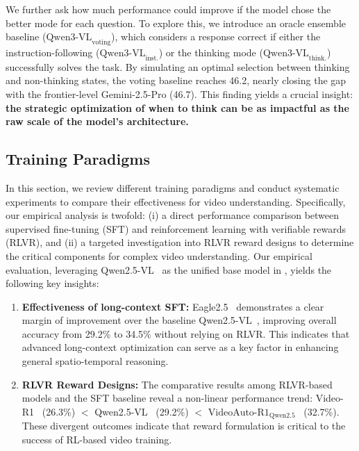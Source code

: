 \documentclass[runningheads]{llncs}
\begin{document}
{        We further ask how much performance could improve if the model chose the better mode for each question.
        To explore this, we introduce an oracle ensemble baseline ($\text{Qwen3-VL}_\text{voting}$), which considers a response correct if either the instruction-following ($\text{Qwen3-VL}_\text{inst.}$) or the thinking mode ($\text{Qwen3-VL}_\text{think.}$) successfully solves the task. 
        By simulating an optimal selection between thinking and non-thinking states, the voting baseline reaches 46.2, nearly closing the gap with the frontier-level Gemini-2.5-Pro (46.7).
        This finding yields a crucial insight: \textbf{the strategic optimization of when to think can be as impactful as the raw scale of the model's architecture.}

    \subsection{Training Paradigms}
    \label{sec:5.3}
        In this section, we review different training paradigms and conduct systematic experiments to compare their effectiveness for video understanding. 
        Specifically, our empirical analysis is twofold: (i) a direct performance comparison between supervised fine-tuning (SFT) and reinforcement learning with verifiable rewards (RLVR), and (ii) a targeted investigation into RLVR reward designs to determine the critical components for complex video understanding.
        Our empirical evaluation, leveraging Qwen2.5-VL~\cite{qwen25vl} as the unified base model in , yields the following key insights:
        \begin{enumerate}
            \item \textbf{Effectiveness of long-context SFT:} Eagle2.5~\cite{eagle25} demonstrates a clear margin of improvement over the baseline Qwen2.5-VL~\cite{qwen25vl}, improving overall accuracy from 29.2\% to 34.5\% without relying on RLVR.
            This indicates that advanced long-context optimization can serve as a key factor in enhancing general spatio-temporal reasoning.
            \item \textbf{RLVR Reward Designs:} The comparative results among RLVR-based models and the SFT baseline reveal a non-linear performance trend: Video-R1~\cite{videor1} (26.3\%) $<$ Qwen2.5-VL~\cite{qwen25vl} (29.2\%) $<$ $\text{VideoAuto-R1}_\text{Qwen2.5}$~\cite{videoautor1} (32.7\%).
            These divergent outcomes indicate that reward formulation is critical to the success of RL-based video training.

\end{enumerate}}
\end{document}
